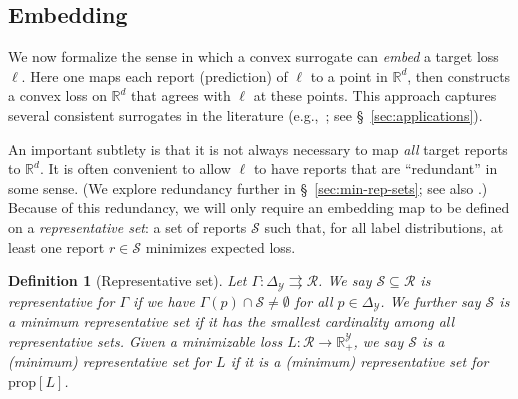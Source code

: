 \documentclass[11pt]{article}
\newcommand{\reals}{\mathbb{R}}
\newcommand{\prop}[1]{\mathrm{prop}[#1]}
\newcommand{\simplex}{\Delta_\Y}
\newcommand{\R}{\mathcal{R}}
\newcommand{\Sc}{\mathcal{S}}
\newcommand{\Y}{\mathcal{Y}}
\newcommand{\toto}{\rightrightarrows}
\newtheorem{definition}{Definition}
\begin{document}



\subsection{Embedding}
\label{sec:embedding}

We now formalize the sense in which a convex surrogate can \emph{embed} a target loss $\ell$.
Here one maps each report (prediction) of $\ell$ to a point in $\reals^d$, then constructs a convex loss on $\reals^d$ that agrees with $\ell$ at these points.
This approach captures several consistent surrogates in the literature (e.g.,~\citep{ramaswamy2015hierarchical,ramaswamy2016convex,lapin2015top,wang2020weston}; see \S~\ref{sec:applications}).

An important subtlety is that it is not always necessary to map \emph{all} target reports to $\reals^d$.
It is often convenient to allow $\ell$ to have reports that are ``redundant'' in some sense. (We explore redundancy further in \S~\ref{sec:min-rep-sets}; see also \citet{wang2020weston}.)
Because of this redundancy, we will only require an embedding map to be defined on a \emph{representative set}: a set of reports $\Sc$ such that, for all label distributions, at least one report $r\in\Sc$ minimizes expected loss.
\begin{definition}[Representative set]
  Let $\Gamma:\simplex\toto\R$.
  We say $\Sc \subseteq \R$ is \emph{representative for $\Gamma$} if we have $\Gamma(p) \cap \Sc \neq \emptyset$ for all $p\in \simplex$.
  We further say $\Sc$ is a \emph{minimum representative set} if it has the smallest cardinality among all representative sets.
  Given a minimizable loss $L:\R\to\reals^\Y_+$, we say $\Sc$ is a (minimum) representative set for $L$ if it is a (minimum) representative set for $\prop L$.
\end{definition}
\end{document}
